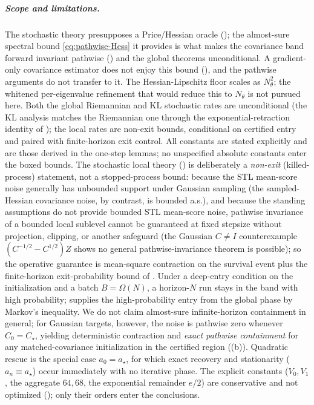 \documentclass[11pt]{article}
\theoremstyle{plain}
\theoremstyle{definition}
\theoremstyle{remark}
\newcommand{\Id}{I}
\begin{document}
\subparagraph{Scope and limitations.}
The stochastic theory presupposes a Price/Hessian oracle (); the almost-sure
spectral bound \eqref{eq:pathwise-Hess} it provides is what makes the covariance band forward
invariant pathwise () and the global theorems unconditional. A gradient-only
covariance estimator does not enjoy this bound (), and the pathwise arguments do not
transfer to it. The Hessian-Lipschitz floor scales as $N_\theta^2$; the whitened per-eigenvalue
refinement that would reduce this to $N_\theta$ is not pursued here. Both the global Riemannian and KL
stochastic rates are unconditional (the KL analysis matches the Riemannian one through the
exponential-retraction identity of ); the local rates are non-exit bounds,
conditional on certified entry and paired with finite-horizon exit control. All constants are stated
explicitly and are those derived in the one-step lemmas; no unspecified absolute constants enter the
boxed bounds.
The stochastic local theory () is deliberately a \emph{non-exit}
(killed-process) statement, not a stopped-process bound: because the STL mean-score noise generally
has unbounded support under Gaussian sampling (the sampled-Hessian covariance noise, by contrast, is
bounded a.s.), and because the standing assumptions do not provide bounded STL mean-score noise,
pathwise invariance of a bounded local sublevel cannot be guaranteed at fixed stepsize without
projection, clipping, or another safeguard (the Gaussian $C\neq\Id$ counterexample $(C^{-1/2}-C^{1/2})Z$
shows no general pathwise-invariance theorem is possible); so the operative guarantee is mean-square
contraction on the survival event plus the
finite-horizon exit-probability bound of . Under a deep-entry condition on
the initialization and a batch $B=\Omega(N)$, a horizon-$N$ run stays in the band with high
probability;  supplies the high-probability entry from the global phase by
Markov's inequality. We do not claim almost-sure infinite-horizon containment in general; for Gaussian
targets, however, the noise is pathwise zero whenever $C_0=C_\star$, yielding deterministic contraction
and \emph{exact pathwise containment} for any matched-covariance initialization in the certified region
((b)). Quadratic rescue is the special case $a_0=a_\star$, for which exact
recovery and stationarity ($a_n\equiv a_\star$) occur immediately with no iterative phase. The explicit constants
($V_0,V_1$, the aggregate $64,68$, the exponential remainder $e/2$) are conservative and not
optimized (); only their orders enter the conclusions.
\end{document}
